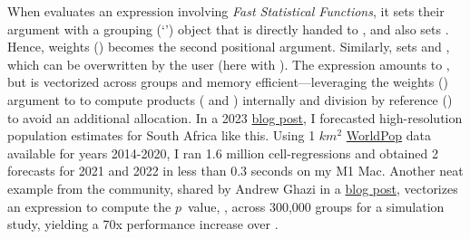 \documentclass[article]{jss} %
\newcommand{\class}[1]{`\code{#1}'}
\newcommand{\fct}[1]{\code{#1()}}
\begin{document}
When \fct{fsummarise} evaluates an expression involving \emph{Fast Statistical Functions}, it sets their  argument with a grouping (\class{GRP}) object that is directly handed to , and also sets . Hence, weights () becomes the second positional argument. Similarly, \fct{fmutate} sets  and , which can be overwritten by the user (here with ). The expression  amounts to , but is vectorized across groups and memory efficient---leveraging the weights () argument to \fct{fsum} to compute products ( and ) internally and division by reference (\code{\%/=\%}) to avoid an additional allocation. In a 2023 \href{https://sebkrantz.github.io/Rblog/2023/04/12/collapse-and-the-fastverse-reflecting-the-past-present-and-future/}{blog post}, I forecasted high-resolution population estimates for South Africa like this. Using 1 $km^2$ \href{https://www.worldpop.org/}{WorldPop} data available for years 2014-2020, I ran 1.6 million cell-regressions and obtained 2 forecasts for 2021 and 2022 in less than 0.3 seconds on my M1 Mac. Another neat example from the community, shared by Andrew Ghazi in a \href{https://andrewghazi.github.io/posts/collapse\_is\_sick/sick.html}{blog post}, vectorizes an expression to compute the $p$~value, , across 300,000 groups for a simulation study, yielding a 70x performance increase over . \newline
\end{document}
